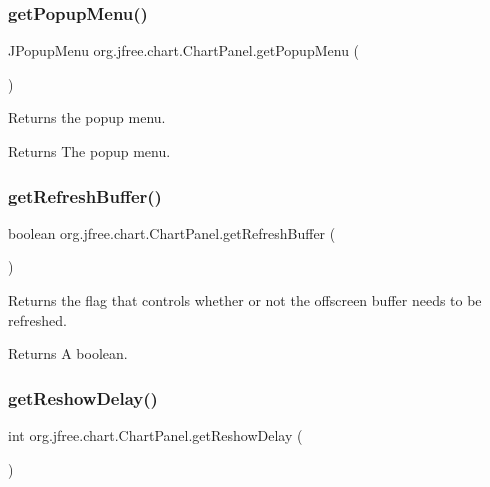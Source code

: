 \subsubsection{\texorpdfstring{get\+Popup\+Menu()}{getPopupMenu()}}
{\footnotesize\ttfamily J\+Popup\+Menu org.\+jfree.\+chart.\+Chart\+Panel.\+get\+Popup\+Menu (\begin{DoxyParamCaption}{ }\end{DoxyParamCaption})}

Returns the popup menu.

\begin{DoxyReturn}{Returns}
The popup menu. 
\end{DoxyReturn}
\mbox{\label{classorg_1_1jfree_1_1chart_1_1_chart_panel_a562363abd0360bedcc23d8bd7d071be7}} 
\subsubsection{\texorpdfstring{get\+Refresh\+Buffer()}{getRefreshBuffer()}}
{\footnotesize\ttfamily boolean org.\+jfree.\+chart.\+Chart\+Panel.\+get\+Refresh\+Buffer (\begin{DoxyParamCaption}{ }\end{DoxyParamCaption})}

Returns the flag that controls whether or not the offscreen buffer needs to be refreshed.

\begin{DoxyReturn}{Returns}
A boolean. 
\end{DoxyReturn}
\mbox{\label{classorg_1_1jfree_1_1chart_1_1_chart_panel_a56547921c8a93a49173c18f43e0890e6}} 
\subsubsection{\texorpdfstring{get\+Reshow\+Delay()}{getReshowDelay()}}
{\footnotesize\ttfamily int org.\+jfree.\+chart.\+Chart\+Panel.\+get\+Reshow\+Delay (\begin{DoxyParamCaption}{ }\end{DoxyParamCaption})}

